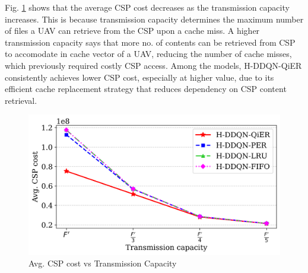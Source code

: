 \documentclass[journal]{IEEEtran}
\begin{document}
Fig. \ref{fig:avg_COST_vs_transmission_capacity} shows that the average CSP cost decreases as the transmission capacity increases. This is because transmission capacity determines the maximum number of files a UAV can retrieve from the CSP upon a cache miss. A higher transmission capacity says that more no. of contents can be retrieved from CSP to accomodate in cache vector of a UAV, reducing the number of cache misses, which previously required costly CSP access. Among the models, H-DDQN-QiER consistently achieves lower CSP cost, especially at higher value, due to its efficient cache replacement strategy that reduces dependency on CSP content retrieval.
\begin{figure}[htbp]
    \centering
    \includegraphics[width=\linewidth]{MinMax Cost Scaled/avg_COST_vs_transmission_capacity.png}  %
    \caption{Avg. CSP cost vs Transmission Capacity}
    \label{fig:avg_COST_vs_transmission_capacity}
\end{figure}

\end{document}
